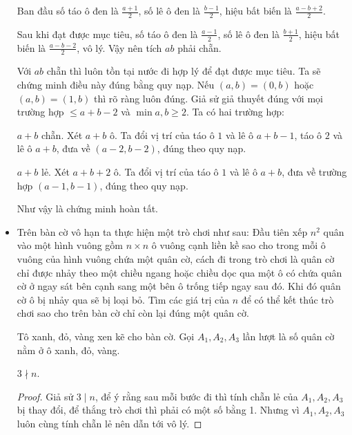 \documentclass[11pt]{scrartcl}
\begin{document}
\begin{itemize}[label=, leftmargin=0em, itemsep=0.5em]
\begin{sol}
        Ban đầu số táo ô đen là $\frac{a + 1}{2}$, số lê ô đen là $\frac{b - 1}{2}$, hiệu bất biến là $\frac{a - b + 2}{2}$. 
        
        Sau khi đạt được mục tiêu, số táo ô đen là $\frac{a - 1}{2}$, số lê ô đen là $\frac{b  + 1}{2}$, hiệu bất biến là $\frac{a - b - 2}{2}$, vô lý. Vậy nên tích $ab$ phải chẵn.

         Với $ab$ chẵn thì luôn tồn tại nước đi hợp lý để đạt được mục tiêu. Ta sẽ chứng minh điều này đúng bằng quy nạp. Nếu $(a, b) = (0,b)$ hoặc $(a,b) = (1,b)$ thì rõ ràng luôn đúng. Giả sử giả thuyết đúng với mọi trường hợp $ \leq a + b - 2$ và $\min{a,b} \geq 2$. Ta có hai trường hợp:
        
        $a + b$ chẵn. Xét $a + b$ ô. Ta đổi vị trí của táo ô $1$ và lê ô $a + b - 1$, táo ô $2$ và lê ô $a + b$, đưa về $(a - 2, b - 2)$, đúng theo quy nạp.
        
        $a + b$ lẻ. Xét $a + b + 2$ ô. Ta đổi vị trí của táo ô $1$ và lê ô $a + b$, đưa về trường hợp $(a - 1, b - 1)$, đúng theo quy nạp.

        Như vậy là chứng minh hoàn tất.
    \end{sol}
    \item \begin{bt} Trên bàn cờ vô hạn ta thực hiện một trò chơi như sau: Đầu tiên xếp $n^2$ quân vào một hình vuông gồm $n \times n$ ô vuông cạnh liền kề sao cho trong mỗi ô vuông của hình vuông chứa một quân cờ, cách đi trong trò chơi là quân cờ chỉ được nhảy theo một chiều ngang hoặc chiều dọc qua một ô có chứa quân cờ ở ngay sát bên cạnh sang một bên ô trống tiếp ngay sau đó. Khi đó quân cờ ô bị nhảy qua sẽ bị loại bỏ. Tìm các giá trị của $n$ để có thể kết thúc trò chơi sao cho trên bàn cờ chỉ còn lại đúng một quân cờ.
    \end{bt}
    \begin{sol}
        
        Tô xanh, đỏ, vàng xen kẽ cho bàn cờ. Gọi $A_1,A_2,A_3$ lần lượt là số quân cờ nằm ở ô xanh, đỏ, vàng.

        $3 \nmid n$. 
        \begin{proof}
            Giả sử $3\mid n$, để ý rằng sau mỗi bước đi thì tính chẵn lẻ của $A_1,A_2,A_3$ bị thay đổi, để thắng trò chơi thì phải có một số bằng 1. Nhưng vì $A_1,A_2,A_3$ luôn cùng tính chẵn lẻ nên dẫn tới vô lý.
        \end{proof}


\end{sol}
\end{itemize}
\end{document}
